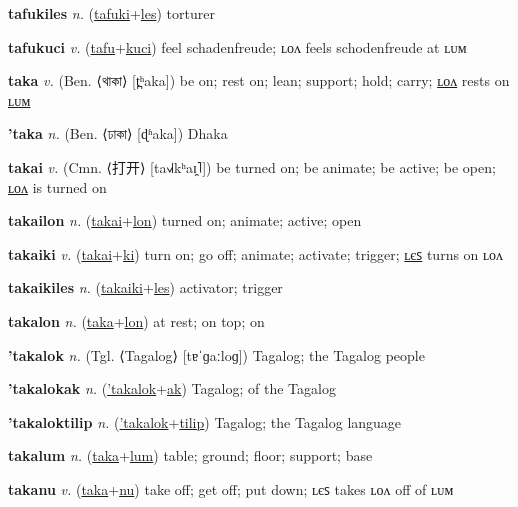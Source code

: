 \textbf{\hypertarget{tafukiles}{tafukiles}} \textit{n.} (\hyperlink{tafuki}{tafuki}+\allowbreak \hyperlink{les}{les})
torturer

\textbf{\hypertarget{tafukuci}{tafukuci}} \textit{v.} (\hyperlink{tafu}{tafu}+\allowbreak \hyperlink{kuci}{kuci})
feel schadenfreude; ʟᴏᴧ feels schodenfreude at ʟᴜᴍ

\textbf{\hypertarget{taka}{taka}} \textit{v.} (Ben. ⟨{\bengali{}থাকা}⟩ [t̪ʰaka])
be on; rest on; lean; support; hold; carry; \hyperlink{takalon}{ʟᴏᴧ} rests on \hyperlink{takalum}{ʟᴜᴍ}

\textbf{\hypertarget{'taka}{'taka}} \textit{n.} (Ben. ⟨{\bengali{}ঢাকা}⟩ [ɖʱaka])
Dhaka

\textbf{\hypertarget{takai}{takai}} \textit{v.} (Cmn. ⟨{\chinese{}打开}⟩ [ta˧˩˧kʰaɪ̯˥])
be turned on; be animate; be active; be open; \hyperlink{takailon}{ʟᴏᴧ} is turned on

\textbf{\hypertarget{takailon}{takailon}} \textit{n.} (\hyperlink{takai}{takai}+\allowbreak \hyperlink{lon}{lon})
turned on; animate; active; open

\textbf{\hypertarget{takaiki}{takaiki}} \textit{v.} (\hyperlink{takai}{takai}+\allowbreak \hyperlink{ki}{ki})
turn on; go off; animate; activate; trigger; \hyperlink{takaikiles}{ʟєꜱ} turns on ʟᴏᴧ

\textbf{\hypertarget{takaikiles}{takaikiles}} \textit{n.} (\hyperlink{takaiki}{takaiki}+\allowbreak \hyperlink{les}{les})
activator; trigger

\textbf{\hypertarget{takalon}{takalon}} \textit{n.} (\hyperlink{taka}{taka}+\allowbreak \hyperlink{lon}{lon})
at rest; on top; on

\textbf{\hypertarget{'takalok}{'takalok}} \textit{n.} (Tgl. ⟨Tagalog⟩ [tɐˈɡaːloɡ])
Tagalog; the Tagalog people

\textbf{\hypertarget{'takalokak}{'takalokak}} \textit{n.} (\hyperlink{'takalok}{'takalok}+\allowbreak \hyperlink{ak}{ak})
Tagalog; of the Tagalog

\textbf{\hypertarget{'takaloktilip}{'takaloktilip}} \textit{n.} (\hyperlink{'takalok}{'takalok}+\allowbreak \hyperlink{tilip}{tilip})
Tagalog; the Tagalog language

\textbf{\hypertarget{takalum}{takalum}} \textit{n.} (\hyperlink{taka}{taka}+\allowbreak \hyperlink{lum}{lum})
table; ground; floor; support; base

\textbf{\hypertarget{takanu}{takanu}} \textit{v.} (\hyperlink{taka}{taka}+\allowbreak \hyperlink{nu}{nu})
take off; get off; put down; ʟєꜱ takes ʟᴏᴧ off of ʟᴜᴍ

